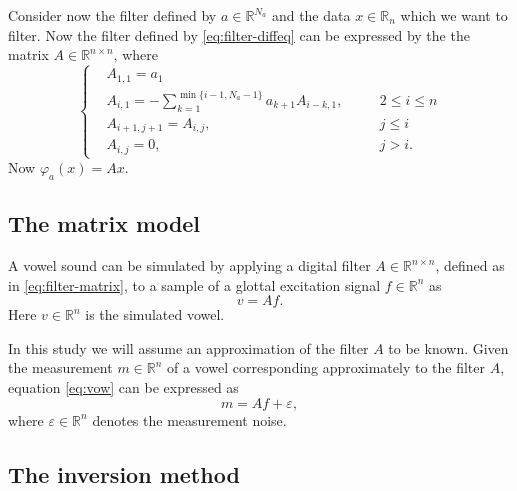 \documentclass[12pt,a4]{article}
\newcommand{\R}{{\mathbb R}}
\newcommand{\eps}{\ensuremath{\varepsilon}}
\begin{document}
Consider now the filter defined by $a \in \R^{N_a}$ and the data $x \in \R_n$ which we want to filter. Now the filter defined by \eqref{eq:filter-diffeq} can be expressed by the the matrix $A \in \R^{n \times n}$, where
\begin{equation}
\label{eq:filter-matrix}
\left\{
\begin{alignedat}{3}
   &A_{1,1}     = a_1 \\
   &A_{i,1}     = - \sum_{k=1}^{\min\{ i-1, N_a-1 \}} a_{k+1} A_{i-k,1}, \quad && 2 \leq i \leq n \\
   &A_{i+1,j+1} = A_{i,j},     && j \leq i \\
   &A_{i,j}     = 0,           && j > i .
\end{alignedat}
\right.
\end{equation}
Now $\varphi_a (x) = Ax$.


\subsection{The matrix model}
\label{sec:matrixModel}

A vowel sound can be simulated by applying a digital filter $A \in \R^{n \times n}$, defined as in \eqref{eq:filter-matrix}, to a sample of a glottal excitation signal $f \in \R^n$ as
\begin{equation}
\label{eq:vow}
v = A f .
\end{equation}
Here $v \in \R^n$ is the simulated vowel.

In this study we will assume an approximation of the filter $A$ to be known. Given the measurement $m \in \R^n$ of a vowel corresponding approximately to the filter $A$, equation \eqref{eq:vow} can be expressed as
\begin{equation}
\label{eq:vowModel}
m = A f + \eps,
\end{equation}
where $\eps \in \R^n$ denotes the measurement noise.


\subsection{The inversion method}\label{sec:invMethod}
\end{document}
